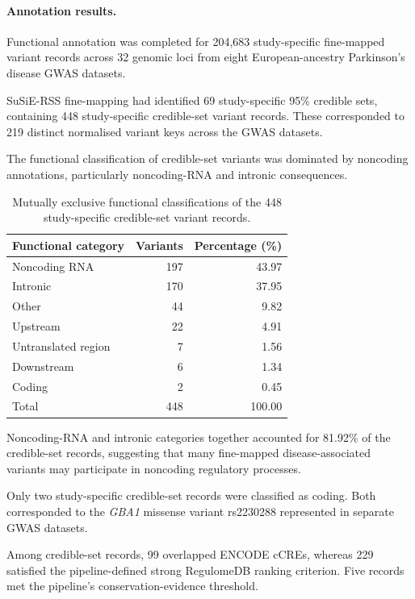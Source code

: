 \documentclass[11pt,a4paper]{article}
\begin{document}
\paragraph{Annotation results.}

Functional annotation was completed for 204,683
study-specific fine-mapped variant records across
32 genomic loci from eight European-ancestry
Parkinson's disease GWAS datasets.

SuSiE-RSS fine-mapping had identified 69 study-specific
95\% credible sets, containing 448 study-specific
credible-set variant records. These corresponded to
219 distinct normalised variant keys across the
GWAS datasets.

The functional classification of credible-set variants
was dominated by noncoding annotations, particularly
noncoding-RNA and intronic consequences.

\begin{table}[t]
\centering
\caption{Mutually exclusive functional classifications
of the 448 study-specific credible-set variant records.}
\label{tab:credible_set_categories}
\small
\begin{tabular}{@{}lrr@{}}
\toprule
Functional category & Variants & Percentage (\%) \\
\midrule
Noncoding RNA & 197 & 43.97 \\
Intronic & 170 & 37.95 \\
Other & 44 & 9.82 \\
Upstream & 22 & 4.91 \\
Untranslated region & 7 & 1.56 \\
Downstream & 6 & 1.34 \\
Coding & 2 & 0.45 \\
\midrule
Total & 448 & 100.00 \\
\bottomrule
\end{tabular}
\end{table}

Noncoding-RNA and intronic categories together accounted
for 81.92\% of the credible-set records, suggesting that
many fine-mapped disease-associated variants may
participate in noncoding regulatory processes.

Only two study-specific credible-set records were
classified as coding. Both corresponded to the
\textit{GBA1} missense variant rs2230288 represented
in separate GWAS datasets.

Among credible-set records, 99 overlapped ENCODE cCREs,
whereas 229 satisfied the pipeline-defined strong
RegulomeDB ranking criterion. Five records met the
pipeline's conservation-evidence threshold.
\end{document}
